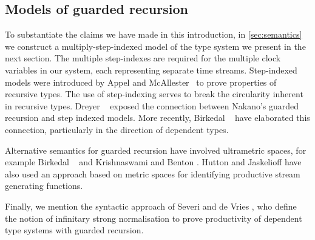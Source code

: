 \subsection{Models of guarded recursion}

To substantiate the claims we have made in this introduction, in
\autoref{sec:semantics} we construct a multiply-step-indexed model of
the type system we present in the next section. The multiple
step-indexes are required for the multiple clock variables in our
system, each representing separate time streams. Step-indexed models
were introduced by Appel and McAllester~\cite{appel01indexed} to prove
properties of recursive types. The use of step-indexing serves to
break the circularity inherent in recursive types. Dreyer
\etal~\cite{dreyer11logical} exposed the connection between Nakano's
guarded recursion and step indexed models. More recently, Birkedal
\etal~\cite{birkedal12first,birkedal13intensional} have elaborated
this connection, particularly in the direction of dependent types.

Alternative semantics for guarded recursion have involved ultrametric
spaces, for example Birkedal \etal~\cite{birkedal10metric} and
Krishnaswami and Benton \cite{krishnaswami11ultrametric}. Hutton and
Jaskelioff \cite{hutton11representing} have also used an approach
based on metric spaces for identifying productive stream generating
functions.

Finally, we mention the syntactic approach of Severi and de Vries
\cite{severi12pure}, who define the notion of infinitary strong
normalisation to prove productivity of dependent type systems with
guarded recursion.

